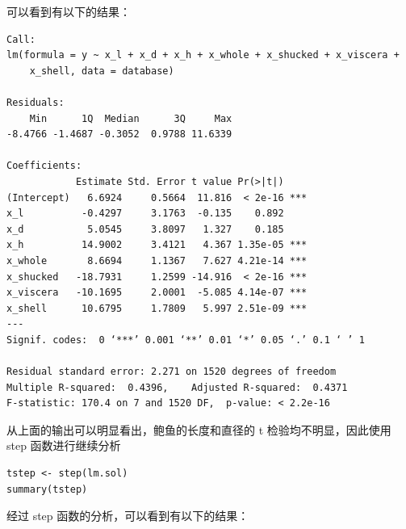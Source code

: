 \documentclass[hyperref,UTF8,12pt,a4paper]{ctexart}
\begin{document}
可以看到有以下的结果：

\begin{verbatim}
Call:
lm(formula = y ~ x_l + x_d + x_h + x_whole + x_shucked + x_viscera + 
    x_shell, data = database)

Residuals:
    Min      1Q  Median      3Q     Max 
-8.4766 -1.4687 -0.3052  0.9788 11.6339 

Coefficients:
            Estimate Std. Error t value Pr(>|t|)    
(Intercept)   6.6924     0.5664  11.816  < 2e-16 ***
x_l          -0.4297     3.1763  -0.135    0.892    
x_d           5.0545     3.8097   1.327    0.185    
x_h          14.9002     3.4121   4.367 1.35e-05 ***
x_whole       8.6694     1.1367   7.627 4.21e-14 ***
x_shucked   -18.7931     1.2599 -14.916  < 2e-16 ***
x_viscera   -10.1695     2.0001  -5.085 4.14e-07 ***
x_shell      10.6795     1.7809   5.997 2.51e-09 ***
---
Signif. codes:  0 ‘***’ 0.001 ‘**’ 0.01 ‘*’ 0.05 ‘.’ 0.1 ‘ ’ 1

Residual standard error: 2.271 on 1520 degrees of freedom
Multiple R-squared:  0.4396,	Adjusted R-squared:  0.4371 
F-statistic: 170.4 on 7 and 1520 DF,  p-value: < 2.2e-16
\end{verbatim}

从上面的输出可以明显看出，鲍鱼的长度和直径的 t 检验均不明显，因此使用 step 函数进行继续分析

\begin{verbatim}
tstep <- step(lm.sol)
summary(tstep)
\end{verbatim}

经过 step 函数的分析，可以看到有以下的结果：
\end{document}
